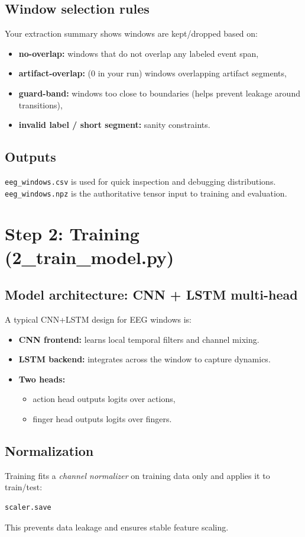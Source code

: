 \documentclass[11pt]{article}
\begin{document}
\subsection{Window selection rules}
Your extraction summary shows windows are kept/dropped based on:
\begin{itemize}[leftmargin=*]
\item \textbf{no-overlap:} windows that do not overlap any labeled event span,
\item \textbf{artifact-overlap:} (0 in your run) windows overlapping artifact segments,
\item \textbf{guard-band:} windows too close to boundaries (helps prevent leakage around transitions),
\item \textbf{invalid label / short segment:} sanity constraints.
\end{itemize}

\subsection{Outputs}
\texttt{eeg\_windows.csv} is used for quick inspection and debugging distributions.
\texttt{eeg\_windows.npz} is the authoritative tensor input to training and evaluation.

\section{Step 2: Training (2\_train\_model.py)}
\subsection{Model architecture: CNN + LSTM multi-head}
A typical CNN+LSTM design for EEG windows is:
\begin{itemize}[leftmargin=*]
\item \textbf{CNN frontend:} learns local temporal filters and channel mixing.
\item \textbf{LSTM backend:} integrates across the window to capture dynamics.
\item \textbf{Two heads:}
  \begin{itemize}
  \item action head outputs logits over actions,
  \item finger head outputs logits over fingers.
  \end{itemize}
\end{itemize}

\subsection{Normalization}
Training fits a \emph{channel normalizer} on training data only and applies it to train/test:
\begin{lstlisting}
scaler.save
\end{lstlisting}
This prevents data leakage and ensures stable feature scaling.
\end{document}
